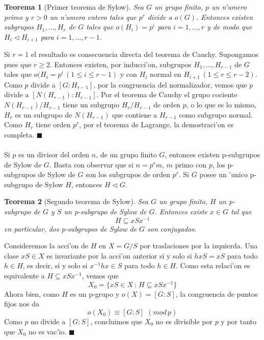 \documentclass[a4paper,openright,12pt]{book}
\numberwithin{equation}{section} %
\newtheorem{teorema}{Teorema}[section] %
\newenvironment{proof}{\noindent{\it Demostracion:}}{\hfill$\blacksquare$} %
\begin{document}
\begin{teorema}[Primer teorema de Sylow]
Sea $G$ un grupo finito, $p$ un n'umero primo y $r > 0$ un n'umero entero tales que $p^{r}$ divide a $o(G)$. Entonces existen subgrupos $H_{1}, \ldots ,H_{r}$ de $G$ tales que $o(H_{i})=p^{i}$ para $i=1,\ldots ,r$ y de modo que $H_{i} \triangleleft H_{i+1}$ para $i=1,\ldots ,r-1$.
\end{teorema}
\begin{proof}
Si $r=1$ el resultado es consecuencia directa del teorema de Cauchy. Supongamos pues que $r \geq 2$. Entonces existen, por inducci'on, subgrupos $H_{1},\ldots ,H_{r-1}$ de $G$ tales que $o(H_{i}=p^{i}\,(1 \leq i \leq r-1)$ y con $H_{i}$ normal en $H_{i+1}\, (1 \leq r \leq r-2)$. Como $p$ divide a $[G:H_{r-1}]$, por la congruencia del normalizador, vemos que $p$ divide a $[N(H_{r-1}):H_{r-1}]$. Por el teorema de Cauchy el grupo cociente $N(H_{r-1})/H_{r-1}$ tiene un subgrupo $H_{r}/H_{r-1}$ de orden $p$, o lo que es lo mismo, $H_{r}$ es un subgrupo de $N(H_{r-1})$ que contiene a $H_{r-1}$ como subgrupo normal. Como $H_{r}$ tiene orden $p^{r}$, por el teorema de Lagrange, la demostraci'on es completa.
\end{proof}\\
\\
Si $p$ es un divisor del orden $n$, de un grupo finito $G$, entonces existen p-subgrupos de Sylow de $G$. Basta con observar que si $n=p^{r}m$, $m$ primo con $p$, los p-subgrupos de Sylow de $G$ son los subgrupos de orden $p^{r}$. Si $G$ posee un 'unico p-subgrupo de Sylow $H$, entonces $H \triangleleft G$.
\begin{teorema}[Segundo teorema de Sylow]
Sea $G$ un grupo finito, $H$ un p-subgrupo de $G$ y $S$ un p-subgrupo de Sylow de $G$. Entonces existe $x \in G$ tal que
\[
H \subseteq xSx^{-1}
\]
en particular, dos p-subgrupos de Sylow de $G$ son conjugados.
\end{teorema}
\begin{proof}
Consideremos la acci'on de $H$ en $X=G/S$ por traslaciones por la izquierda. Una clase $xS \in X$ es invariante por la acci'on anterior si y solo si $hxS=xS$ para todo $h \in H$, es decir, si y solo si $x^{-1}hx \in S$ para todo $h \in H$. Como esta relaci'on es equivalente a $H \subseteq xSx^{-1}$, vemos que
\[
X_{0}=\{ xS \in X \, : \, H \subseteq xSx^{-1} \}
\]
Ahora bien, como $H$ es un p-grupo y $o(X)=[G:S]$, la congruencia de puntos fijos nos da 
\[
o(X_{0}) \equiv [G:S] \, \, (mod \, p)
\]
Como $p$ no divide a $[G:S]$, concluimos que $X_{0}$ no es divisible por $p$ y por tanto que $X_{0}$ no es vac'io.
\end{proof}\\
\end{document}
